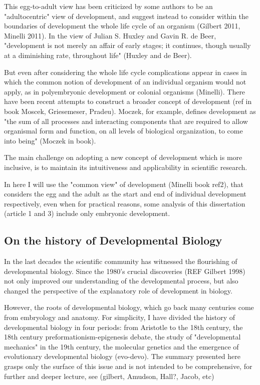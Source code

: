 This egg-to-adult view has been criticized by some authors to be an "adultocentric" view of development, and suggest instead to consider within the boundaries of development the whole life cycle of an organism (Gilbert 2011, Minelli 2011).
In the view of Julian S. Huxley and Gavin R. de Beer, "development is not merely an affair of early stages; it continues, though usually at a diminishing rate, throughout life" (Huxley and de Beer).


But even after considering the whole life cycle complications appear in cases in which the common notion of development of an individual organism would not apply, as in polyembryonic development or colonial organisms (Minelli).
There have been recent attempts to construct a broader concept of development (ref in book Moscek, Griesemeser, Pradeu). Moczek, for example, defines development as "the sum of all processes and interacting components that are required to allow organismal form and function, on all levels of biological organization, to come into being" (Moczek in book).

The main challenge on adopting a new concept of development which is more inclusive, is to maintain its intuitiveness and applicability in scientific research.

In here I will use the "common view" of development (Minelli book ref2), that considers the egg and the adult as the start and end of individual development respectively, even when for practical reasons, some analysis of this dissertation (article 1 and 3) include only embryonic development. 


\subsection{On the history of Developmental Biology}

In the last decades the scientific community has witnessed the flourishing of developmental biology.
Since the 1980's crucial discoveries (REF Gilbert 1998) not only improved our understanding of the developmental process, but also changed the perspective of the explanatory role of development in biology.

However, the roots of developmental biology, which go back many centuries come from embryology and anatomy.
For simplicity, I have divided the history of developmental biology in four periods: from Aristotle to the 18th century, the 18th century preformationism-epigenesis debate, the study of "developmental mechanics" in the 19th century, the molecular genetics and the emergence of evolutionary developmental biology (evo-devo).
The summary presented here grasps only the surface of this issue and is not intended to be comprehensive, for further and deeper lecture, see (gilbert, Amudson, Hall?, Jacob, etc)


